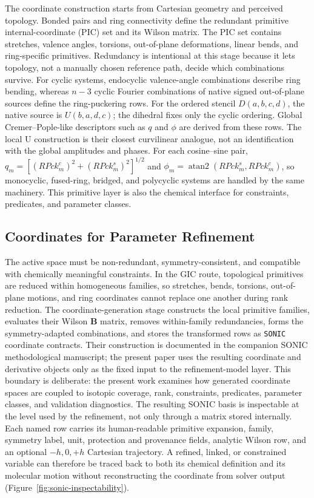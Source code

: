 \documentclass[aip,jcp,reprint,longbibliography,floatfix]{revtex4-2}
\begin{document}
The coordinate construction starts from Cartesian geometry and perceived
topology. Bonded pairs and ring connectivity define the redundant primitive
internal-coordinate (PIC) set and its Wilson matrix. The PIC set contains
stretches, valence angles, torsions, out-of-plane deformations,
linear bends, and ring-specific primitives. Redundancy is intentional at this
stage because it lets topology, not a manually chosen reference path, decide
which combinations survive. For cyclic systems, endocyclic valence-angle
combinations describe ring bending, whereas \(n-3\) cyclic Fourier
combinations of native signed out-of-plane sources define the ring-puckering
rows. For the ordered stencil \(D(a,b,c,d)\), the native source is
\(U(b,a,d,c)\); the dihedral fixes only the cyclic ordering. Global
Cremer--Pople-like descriptors such as $q$ and $\phi$ are derived from these
rows. The local U construction is their closest curvilinear analogue, not an
identification with the global amplitudes and phases.  For each cosine--sine
pair, \(q_m=[(RPck_m^c)^2+(RPck_m^s)^2]^{1/2}\) and
\(\phi_m=\operatorname{atan2}(RPck_m^s,RPck_m^c)\), so
monocyclic, fused-ring, bridged, and polycyclic systems are handled by the
same machinery.\cite{CremerPople1975} This
primitive layer is also the chemical interface for constraints, predicates,
and parameter classes.


\subsection{Coordinates for Parameter Refinement}

The active space must be non-redundant, symmetry-consistent, and compatible
with chemically meaningful constraints. In the GIC route, topological
primitives are reduced within homogeneous families, so stretches, bends,
torsions, out-of-plane motions, and ring coordinates cannot replace one
another during rank reduction.\cite{PulayFogarasi1992,Peng1996Redundant,Baker1996Delocalized,BakkenHelgaker2002,Marenich2025GIC}
The coordinate-generation stage constructs the local primitive families,
evaluates their Wilson $\mathbf{B}$ matrix, removes within-family
redundancies, forms the symmetry-adapted combinations, and stores the
transformed rows as \texttt{SONIC} coordinate contracts. Their construction is
documented in the companion SONIC methodological manuscript;\cite{Barone2026SONIC}
the present paper uses the resulting coordinate and derivative objects only as
the fixed input to the refinement-model layer. This boundary is deliberate: the
present work examines how generated coordinate spaces are coupled to isotopic
coverage, rank, constraints, predicates, parameter classes, and validation
diagnostics.
The resulting SONIC basis is inspectable at the level used by the refinement,
not only through a matrix stored internally.  Each named row carries its
human-readable primitive expansion, family, symmetry label, unit, protection
and provenance fields, analytic Wilson row, and an optional $-h,0,+h$
Cartesian trajectory.  A refined, linked, or constrained variable can
therefore be traced back to both its chemical definition and its molecular
motion without reconstructing the coordinate from solver output
(Figure~\ref{fig:sonic-inspectability}).
\end{document}
